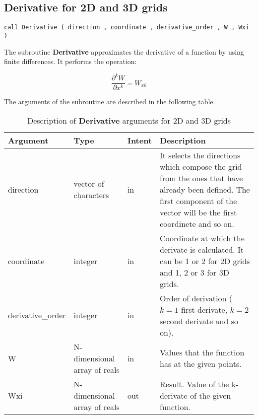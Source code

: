 \subsection*{Derivative for 2D and 3D grids}

\lstset{language=Fortran}
\begin{lstlisting}[frame=trBL]
call Derivative ( direction , coordinate , derivative_order , W , Wxi )
\end{lstlisting}

The subroutine \textbf{Derivative} approximates the derivative of a function by using finite differences. It performs the operation:

\begin{equation*}
\frac{\partial^k W}{\partial x^k}= W_{xk}
\end{equation*}

The arguments of the subroutine are described in the following table.

\begin{table}[H]
	\begin{center}
		\begin{spacing}{1.2}
			\begin{tabular}{| l | l | l | p{6cm} |}
				
				\hline
				
				\bf Argument & \bf Type & \bf Intent & \bf Description \\ \hline \hline
				
				direction & vector of characters & in & It selects the directions  which compose the grid from the ones that have already been defined. The first component of the vector will be the first coordinete and so on. \\ \hline
				
				coordinate & integer & in & Coordinate at which the derivate is calculated. It can be 1 or 2 for 2D grids and 1, 2 or 3 for 3D grids.  \\ \hline
				
				derivative\_order &  integer & in & Order of derivation ($k=1$ first derivate, $k=2$ second derivate and so on).\\ \hline
				
				W &  N-dimensional array of reals & in & Values that the function has at the given points.\\ \hline
				
				Wxi & N-dimensional array of reals & out & Result. Value of the k-derivate of the given function.\\ \hline
				
			\end{tabular}
		\end{spacing}
	\end{center}
	\caption{Description of \textbf{Derivative} arguments for 2D and 3D grids}
\end{table}

